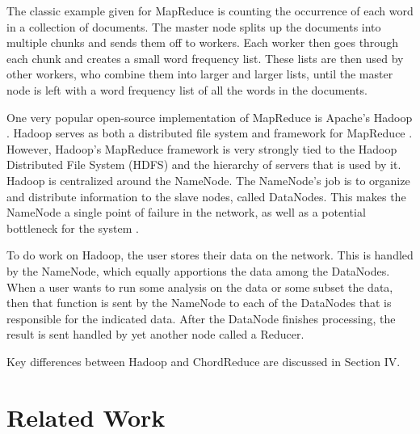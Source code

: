 \documentclass[10pt, conference, compsocconf]{IEEEtran}
\begin{document}
The classic example given for MapReduce is counting the occurrence of each word in a collection of documents.  The master node splits up the documents into multiple chunks and sends them off to workers.  Each worker then goes through each chunk and creates a small word frequency list.  These lists are then used by other workers, who combine them into larger and larger lists, until the master node is left with a word frequency list of all the words in the documents. 



 

One very popular open-source implementation of MapReduce is Apache's Hadoop \cite{Hadoop}.  Hadoop serves as both a distributed file system and framework for MapReduce \cite{shvachko2010hadoop}.  However,  Hadoop's MapReduce framework is very strongly tied to the Hadoop Distributed File System (HDFS) and the hierarchy of servers that is used by it.  Hadoop is centralized around the NameNode.  The NameNode's job is to organize and distribute information to the slave nodes, called DataNodes.  This makes the NameNode a single point of failure \cite{shvachko2010hadoop} in the network, as well as a potential bottleneck for the system \cite{hadoop-bottle}.

To do work on Hadoop, the user stores their data on the network.  This is handled by the NameNode, which equally apportions the data among the DataNodes.  When a user wants to run some analysis on the data or some subset the data, then that function is sent by the NameNode to each of the DataNodes that is responsible for the indicated data.   After the DataNode finishes processing, the result is sent handled by yet another node called a Reducer.

Key differences between Hadoop and ChordReduce are discussed in Section IV.


\section{Related Work}
\end{document}
